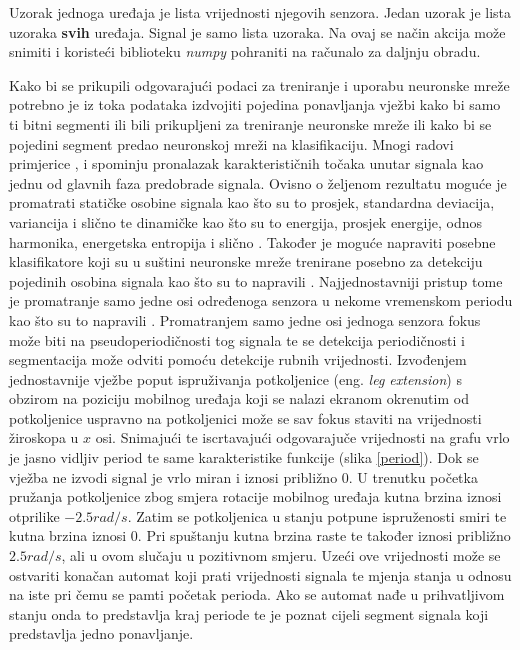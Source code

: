 \documentclass[times, utf8, diplomski]{fer}
\begin{document}
Uzorak jednoga uređaja je lista vrijednosti njegovih senzora. Jedan uzorak je lista uzoraka \textbf{svih} uređaja. Signal je samo lista uzoraka. Na ovaj se način akcija 
može snimiti i koristeći biblioteku \textit{numpy} pohraniti na računalo za daljnju obradu.

Kako bi se prikupili odgovarajući podaci za treniranje i uporabu neuronske mreže potrebno je iz toka podataka izdvojiti pojedina ponavljanja vježbi kako bi samo ti bitni
segmenti ili bili prikupljeni za treniranje neuronske mreže ili kako bi se pojedini segment predao neuronskoj mreži na klasifikaciju. 
Mnogi radovi primjerice \cite{android}, \cite{exo} i \cite{LowerLimb} spominju pronalazak karakterističnih točaka unutar signala
kao jednu od glavnih faza predobrade signala. Ovisno o željenom rezultatu moguće je promatrati statičke osobine signala
kao što su to prosjek, standardna deviacija, variancija i slično te dinamičke kao što su to energija, prosjek energije, odnos
harmonika, energetska entropija i slično \citep{android}. Također je moguće napraviti posebne klasifikatore koji su u suštini
neuronske mreže trenirane posebno za detekciju pojedinih osobina signala kao što su to napravili \cite{exo}. 
Najjednostavniji pristup tome je promatranje samo jedne osi određenoga senzora u nekome vremenskom periodu kao što su to napravili
\cite{LowerLimb}. Promatranjem samo jedne osi jednoga senzora fokus može biti na pseudoperiodičnosti tog signala te se detekcija
periodičnosti i segmentacija može odviti pomoću detekcije rubnih vrijednosti. Izvođenjem jednostavnije vježbe poput ispruživanja
potkoljenice (eng. \textit{leg extension}) s obzirom na poziciju mobilnog uređaja koji se nalazi ekranom okrenutim od potkoljenice uspravno na
potkoljenici može se sav fokus staviti na vrijednosti žiroskopa u $x$ osi. Snimajući te iscrtavajući odgovarajuče vrijednosti
na grafu vrlo je jasno vidljiv period te same karakteristike funkcije (slika \ref{period}). Dok se vježba ne izvodi signal je
vrlo miran i iznosi približno 0. U trenutku početka pružanja potkoljenice zbog smjera rotacije mobilnog uređaja kutna brzina iznosi
otprilike $-2.5 rad/s$. Zatim se potkoljenica u stanju potpune ispruženosti smiri te kutna brzina iznosi 0. Pri spuštanju kutna
brzina raste te također iznosi približno $2.5 rad/s$, ali u ovom slučaju u pozitivnom smjeru. Uzeći ove vrijednosti može se ostvariti
konačan automat koji prati vrijednosti signala te mjenja stanja u odnosu na iste pri čemu se pamti početak perioda. Ako se automat nađe u
prihvatljivom stanju onda to predstavlja kraj periode te je poznat cijeli segment signala koji predstavlja jedno ponavljanje.
\end{document}
